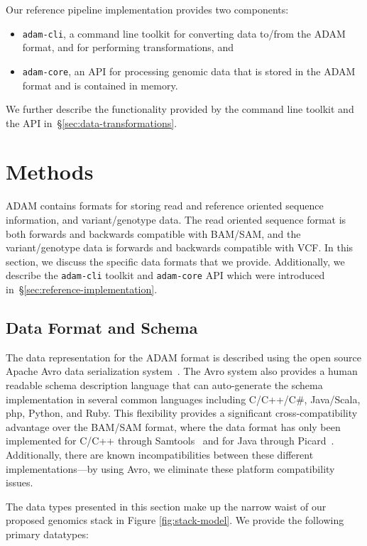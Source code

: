 \documentclass{bioinfo}
\begin{document}
Our reference pipeline implementation provides two components:

\begin{itemize}
\item \texttt{adam-cli}, a command line toolkit for converting data to/from the ADAM format, and for performing transformations, and
\item \texttt{adam-core}, an API for processing genomic data that is stored in the ADAM format and is contained in memory.
\end{itemize}

\noindent We further describe the functionality provided by the command line toolkit and the API in~\S\ref{sec:data-transformations}.

\section{Methods}
\label{sec:methods}

ADAM contains formats for storing read and reference oriented sequence information, and variant/genotype data. The read oriented sequence format is both forwards and
backwards compatible with BAM/SAM, and the variant/genotype data is forwards and backwards compatible with VCF. In this section, we discuss the specific data formats
that we provide. Additionally, we describe the \texttt{adam-cli} toolkit and \texttt{adam-core} API which were introduced in~\S\ref{sec:reference-implementation}.

\subsection{Data Format and Schema}
\label{sec:data-format-and-schema}

The data representation for the ADAM format is described using the open source Apache Avro data serialization system~\citep{avro}. The Avro system also provides a human
readable schema description language that can auto-generate the schema implementation in several common languages including C/C++/C\#, Java/Scala, php, Python, and
Ruby. This flexibility provides a significant cross-compatibility advantage over the BAM/SAM format, where the data format has only been implemented for C/C++ through
Samtools~\citep{li09} and for Java through Picard~\citep{picard}. Additionally, there are known incompatibilities between these different implementations---by using Avro,
we eliminate these platform compatibility issues.

The data types presented in this section make up the narrow waist of our proposed genomics stack in Figure \ref{fig:stack-model}. We provide the following primary datatypes:
\end{document}
